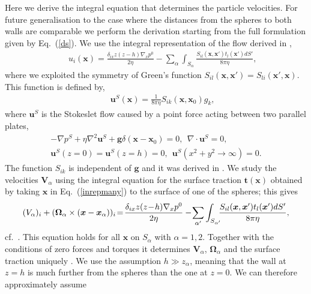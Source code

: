 Here we derive the integral equation that determines the particle velocities. For future generalisation to the case where the distances from the spheres to both walls are comparable we perform the derivation starting from the full formulation given by Eq.~(\ref{ds}).
We use the integral representation of the flow derived in \cite{Fouxon_2017},
\begin{eqnarray}&&\!\!\!\!\!\!\!\!\!
u_i(\bm x)\!=\!\frac{\delta_{ix}z(z\!-\!h)\nabla_x p^0}{2\eta}\!-\!\sum_{\alpha}\int_{S_{\alpha}}\!\!\!\frac{S_{il}(\bm x, \bm x')t_{l}(\bm x')dS'}{8\pi \eta},\label{inrepmany}
\end{eqnarray}
where we exploited the symmetry \citep{ps} of Green's function $S_{il}(\bm x, \bm x')=S_{li}(\bm x', \bm x)$. This function is defined by,
\begin{eqnarray}&&\!\!\!\!\!\!\!\!\!\!
\bm u^S(\bm x)=\frac{1}{8\pi \eta}S_{ik}(\bm x, \bm x_0)g_k, \label{vl}
\end{eqnarray}
where $\bm u^S$ is the Stokeslet flow caused by a point force acting between two parallel plates,
\begin{equation}
  \begin{aligned}
-\nabla p^S+\eta \nabla^2 \bm u^S+\bm g\delta(\bm x-\bm x_0)=0,\ \ \nabla\cdot\bm u^S=0, \\  \bm u^S(z=0)=\bm u^S(z=h)=0,\ \ \bm u^S(x^2+y^2\to\infty)=0.\label{stokes1}
  \end{aligned}
\end{equation}
The function $S_{ik}$ is independent of $\bm g$ and it was derived in \cite{LironMochon}. We study the velocities $\bm V_{\alpha}$ using the integral equation for the surface traction $\bm t(\bm x)$ obtained by taking
$\bm x$ in Eq.~(\ref{inrepmany}) to the surface of one of the spheres; this gives
\begin{equation}%
  \small
(V_{\alpha})_i+(\bm \Omega_{\alpha}\times (\bm x-\bm x_{\alpha}))_i\!=\!\frac{\delta_{ix}z(z\!-\!h)\nabla_x p^0}{2\eta}
-\!\sum_{\alpha'}\int_{S_{\alpha'}}\!\!\!\frac{S_{il}(\bm x, \bm x')t_{l}(\bm x')dS'}{8\pi \eta}, \label{intr1}
\end{equation}
cf.\ \cite{ps}. This equation holds for all $\bm x$ on $S_{\alpha}$ with $\alpha=1, 2$. Together with the conditions of zero forces and torques it determines $\bm V_{\alpha}$, $\bm \Omega_{\alpha}$ and the surface traction
uniquely \citep{kim_karrila}. We use the assumption $h\gg z_{\alpha}$, meaning that the wall at $z=h$ is much further from the spheres than the one at $z=0$. We can therefore approximately assume
